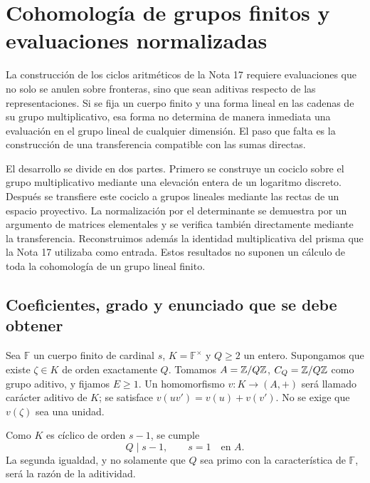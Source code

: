 \section{Cohomología de grupos finitos y evaluaciones normalizadas}
\label{sec:evaluaciones-finitas}

La construcción de los ciclos aritméticos de la Nota 17 requiere evaluaciones que no solo se anulen sobre fronteras, sino que sean aditivas respecto de las representaciones. Si se fija un cuerpo finito y una forma lineal en las cadenas de su grupo multiplicativo, esa forma no determina de manera inmediata una evaluación en el grupo lineal de cualquier dimensión. El paso que falta es la construcción de una transferencia compatible con las sumas directas.

El desarrollo se divide en dos partes. Primero se construye un cociclo sobre el grupo multiplicativo mediante una elevación entera de un logaritmo discreto. Después se transfiere este cociclo a grupos lineales mediante las rectas de un espacio proyectivo. La normalización por el determinante se demuestra por un argumento de matrices elementales y se verifica también directamente mediante la transferencia. Reconstruimos además la identidad multiplicativa del prisma que la Nota 17 utilizaba como entrada. Estos resultados no suponen un cálculo de toda la cohomología de un grupo lineal finito.

\subsection{Coeficientes, grado y enunciado que se debe obtener}

Sea $\mathbb F$ un cuerpo finito de cardinal $s$, $K=\mathbb F^\times$ y $Q\ge2$ un entero. Supongamos que existe $\zeta\in K$ de orden exactamente $Q$. Tomamos $A=\mathbb{Z}/Q\mathbb{Z}$, $C_Q=\mathbb{Z}/Q\mathbb{Z}$ como grupo aditivo, y fijamos $E\ge1$. Un homomorfismo $v:K\to(A,+)$ será llamado carácter aditivo de $K$; se satisface $v(uv')=v(u)+v(v')$. No se exige que $v(\zeta)$ sea una unidad.

Como $K$ es cíclico de orden $s-1$, se cumple
\begin{equation}
 Q\mid s-1,\qquad s=1\quad\text{en }A.
 \label{eq:ev-coef}
\end{equation}
La segunda igualdad, y no solamente que $Q$ sea primo con la característica de $\mathbb F$, será la razón de la aditividad.

